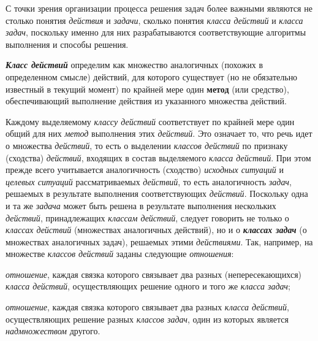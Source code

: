 С точки зрения организации процесса решения задач более важными являются не столько понятия \textit{действия} и \textit{задачи}, сколько понятия \textit{класса действий} и \textit{класса задач}, поскольку именно для них разрабатываются соответствующие алгоритмы выполнения и способы решения.

\textbf{\textit{Класс действий}} определим как  множество аналогичных (похожих в определенном смысле) действий, для которого существует (но не обязательно известный в текущий момент) по крайней мере один \textbf{метод} (или средство), обеспечивающий выполнение  действия из указанного множества действий.

\begin{SCn}
\end{SCn}

Каждому выделяемому \textit{классу действий} соответствует по крайней мере один общий для них \textit{метод} выполнения этих \textit{действий}. Это означает то, что речь идет о   множества \textit{действий}, то есть о выделении \textit{классов действий} по признаку  (сходства) \textit{действий}, входящих в состав выделяемого \textit{класса действий}. При этом прежде всего учитывается аналогичность (сходство) \textit{исходных ситуаций} и \textit{целевых ситуаций} рассматриваемых \textit{действий}, то есть аналогичность \textit{задач}, решаемых в результате выполнения соответствующих \textit{действий}. Поскольку одна и та же \textit{задача} может быть решена в результате выполнения нескольких  \textit{действий}, принадлежащих  \textit{классам действий}, следует говорить не только о \textit{классах действий} (множествах аналогичных действий), но и о \textbf{\textit{классах задач}} (о множествах аналогичных задач), решаемых этими \textit{действиями}. Так, например, на множестве \textit{классов действий} заданы следующие \textit{отношения}:
\begin{textitemize}
	\item \textit{отношение}, каждая связка которого связывает два разных (непересекающихся) \textit{класса действий}, осуществляющих решение одного и того же \textit{класса задач};
	\item \textit{отношение}, каждая связка которого связывает два разных \textit{класса действий}, осуществляющих решение разных \textit{классов задач}, один из которых является \textit{надмножеством} другого.
\end{textitemize}

